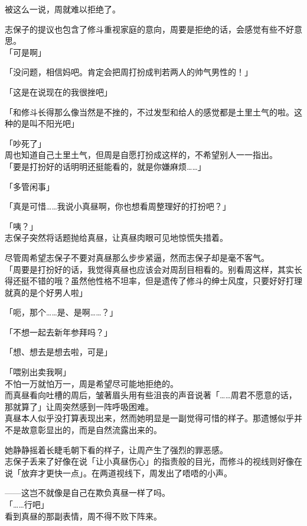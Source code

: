 被这么一说，周就难以拒绝了。

志保子的提议也包含了修斗重视家庭的意向，周要是拒绝的话，会感觉有些不好意思。\\

「可是啊」

「没问题，相信妈吧。肯定会把周打扮成判若两人的帅气男性的！」

「这是在说现在的我很挫吧」

「和修斗长得那么像当然是不挫的，不过发型和给人的感觉都是土里土气的啦。这种的是叫不阳光吧」

「吵死了」\\

周也知道自己土里土气，但周是自愿打扮成这样的，不希望别人一一指出。\\

「要是打扮好的话明明还挺能看的，就是你嫌麻烦……」

「多管闲事」

「真是可惜……我说小真昼啊，你也想看周整理好的打扮吧？」

「咦？」\\

志保子突然将话题抛给真昼，让真昼肉眼可见地惊慌失措着。

尽管周希望志保子不要对真昼那么步步紧逼，然而志保子却是毫不客气。\\

「周要是打扮好的话，我觉得真昼也应该会对周刮目相看的。别看周这样，其实长得还挺不错的哦？虽然他性格不坦率，但是遗传了修斗的绅士风度，只要好好打理就真的是个好男人啦」

「呃，那个……是、是啊……？」

「不想一起去新年参拜吗？」

「想、想去是想去啦，可是」

「喂别出卖我啊」\\

不怕一万就怕万一，周是希望尽可能地拒绝的。\\

而真昼看向吐槽的周后，皱著眉头用有些沮丧的声音说著「……周君不愿意的话，那就算了」让周突然感到一阵呼吸困难。\\

真昼本人似乎没打算表现出来，然而她明显是一副觉得可惜的样子。那遗憾似乎并不是故意彰显出的，而是自然流露出来的。

她静静摇着长睫毛朝下看的样子，让周产生了强烈的罪恶感。\\

志保子丢来了好像在说「让小真昼伤心」的指责般的目光，而修斗的视线则好像在说「放弃才更快一点」。在两道视线下，周发出了唔唔的小声。

——这岂不就像是自己在欺负真昼一样了吗。\\

「……行吧」\\

看到真昼的那副表情，周不得不败下阵来。
